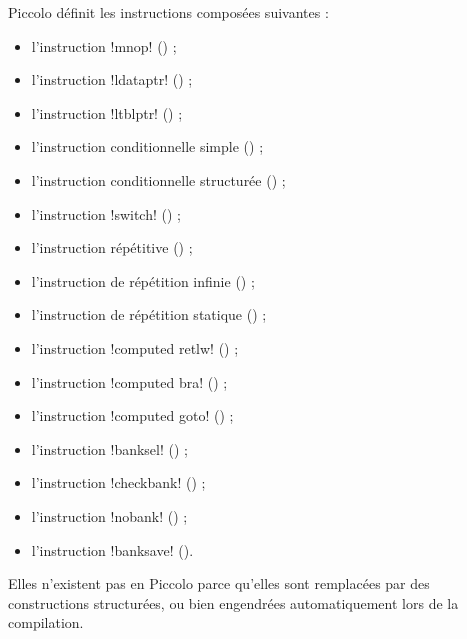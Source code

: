 
Piccolo définit les instructions composées suivantes :
\begin{itemize}
  \item l'instruction \pic!mnop! () ;
  \item l'instruction \pic!ldataptr! () ;
  \item l'instruction \pic!ltblptr! () ;
  \item l'instruction conditionnelle simple () ;
  \item l'instruction conditionnelle structurée () ;
  \item l'instruction \pic!switch! () ;
  \item l'instruction répétitive () ;
  \item l'instruction de répétition infinie () ;
  \item l'instruction de répétition statique () ;
  \item l'instruction \pic!computed retlw! () ;
  \item l'instruction \pic!computed bra! () ;
  \item l'instruction \pic!computed goto! () ;
  \item l'instruction \pic!banksel! () ;
  \item l'instruction \pic!checkbank! () ;
  \item l'instruction \pic!nobank! () ;
  \item l'instruction \pic!banksave! ().
\end{itemize}





Elles n’existent pas en Piccolo parce qu’elles sont remplacées par des constructions structurées, ou bien engendrées automatiquement lors de la compilation.

